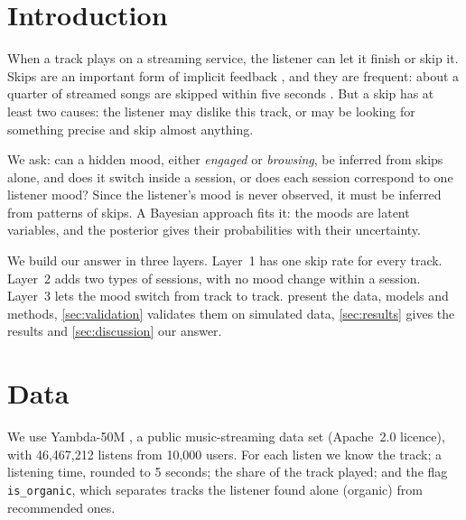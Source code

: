 \documentclass[12pt]{article}
\begin{document}
\section{Introduction}\label{sec:introduction}


When a track plays on a streaming service, the listener can let it finish or skip it. Skips are an important form of implicit feedback \citep{brost2019music}, and they are frequent: about a quarter of streamed songs are skipped within five seconds \citep{montecchio2020skipping}. But a skip has at least two causes: the listener may dislike this track, or may be looking for something precise and skip almost anything.

We ask: can a hidden mood, either \emph{engaged} or \emph{browsing}, be inferred from skips alone, and does it switch inside a session, or does each session correspond to one listener mood? Since the listener's mood is never observed, it must be inferred from patterns of skips. A Bayesian approach fits it: the moods are latent variables, and the posterior gives their probabilities with their uncertainty.

We build our answer in three layers. Layer~1 has one skip rate for every track. Layer~2 adds two types of sessions, with no mood change within a session. Layer~3 lets the mood switch from track to track.  present the data, models and methods, \cref{sec:validation} validates them on simulated data, \cref{sec:results} gives the results and \cref{sec:discussion} our answer.

\section{Data}\label{sec:data}

We use Yambda-50M \citep{ploshkin2025yambda, yandex2025card}, a public music-streaming data set (Apache~2.0 licence), with 46{,}467{,}212 listens from 10{,}000 users. For each listen we know the track; a listening time, rounded to 5 seconds; the share of the track played; and the flag \texttt{is\_organic}, which separates tracks the listener found alone (organic) from recommended ones.
\end{document}
